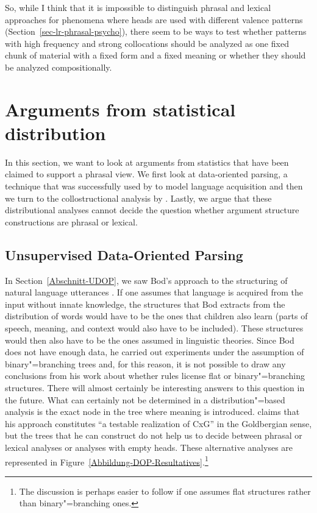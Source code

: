 \begin{exe}
\begin{xlist}[iv.]
\begin{exe}
\begin{xlist}[iv.]
So, while I think that it is impossible to distinguish phrasal and lexical approaches for phenomena
where heads are used with different valence patterns (Section~\ref{sec-lr-phrasal-psycho}), there seem to be ways to test whether patterns
with high frequency and strong collocations should be analyzed as one fixed chunk of material with a
fixed form and a fixed meaning or whether they should be analyzed compositionally.




\section{Arguments from statistical distribution}
\label{stat-sec}

In this section, we want to look at arguments from statistics that have been claimed to support a phrasal
view.  We first look at data-oriented parsing, a technique that was successfully used by
\citet{Bod2009a} to model language acquisition and then we turn to the collostructional analysis by
\citet{SG2009a}.  Lastly, we argue that these distributional analyses cannot decide the question
whether argument structure constructions are phrasal or lexical.

\subsection{Unsupervised Data-Oriented Parsing}
\label{Abschnitt-U-Dop-phrasal}

In Section~\ref{Abschnitt-UDOP},
we saw Bod's approach to the structuring of natural language utterances \citeyearpar{Bod2009a}.
If one assumes that language is acquired from the input without innate knowledge, the structures
that Bod extracts from the distribution of words would have to be the ones that children also learn
(parts of speech, meaning, and context would also have to be included). These structures would then
also have to be the ones assumed in linguistic theories. Since Bod does not have enough data, he
carried out experiments under the assumption of binary"=branching trees and, for this reason, it is
not possible to draw any conclusions from his work about whether rules license flat or
binary"=branching structures. There will almost certainly be interesting answers to this question in
the future. What can certainly not be determined in a distribution"=based analysis is the exact node
in the tree where meaning is introduced. \citet[]{Bod2009b} claims that his approach
constitutes ``a testable realization of CxG'' in the Goldbergian sense, but the trees that he can
construct do not help us to decide between phrasal or lexical analyses or analyses with empty
heads. These alternative analyses are represented in
Figure~\vref{Abbildung-DOP-Resultatives}.\footnote{%
The discussion is perhaps easier to follow if one assumes flat structures rather than
binary"=branching ones.

}
\end{xlist}
\end{exe}
\end{xlist}
\end{exe}
